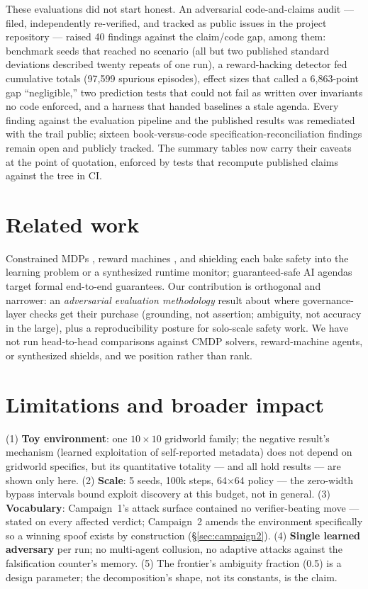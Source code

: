 \documentclass{article}
\begin{document}
These evaluations did not start honest. An adversarial code-and-claims audit --- filed, independently re-verified, and tracked as public issues in the project repository --- raised 40 findings against the claim/code gap, among them: benchmark seeds that reached no scenario (all but two published standard deviations described twenty repeats of one run), a reward-hacking detector fed cumulative totals (97{,}599 spurious episodes), effect sizes that called a 6{,}863-point gap ``negligible,'' two prediction tests that could not fail as written over invariants no code enforced, and a harness that handed baselines a stale agenda. Every finding against the evaluation pipeline and the published results was remediated with the trail public; sixteen book-versus-code specification-reconciliation findings remain open and publicly tracked. The summary tables now carry their caveats at the point of quotation, enforced by tests that recompute published claims against the tree in CI.

\section{Related work}

Constrained MDPs \citep{altman1999constrained, achiam2017constrained}, reward machines \citep{toroicarte2022reward}, and shielding \citep{alshiekh2018safe} each bake safety into the learning problem or a synthesized runtime monitor; guaranteed-safe AI agendas \citep{dalrymple2024towards} target formal end-to-end guarantees. Our contribution is orthogonal and narrower: an \emph{adversarial evaluation methodology} result about where governance-layer checks get their purchase (grounding, not assertion; ambiguity, not accuracy in the large), plus a reproducibility posture for solo-scale safety work. We have not run head-to-head comparisons against CMDP solvers, reward-machine agents, or synthesized shields, and we position rather than rank.

\section{Limitations and broader impact}

(1) \textbf{Toy environment}: one $10\times10$ gridworld family; the negative result's mechanism (learned exploitation of self-reported metadata) does not depend on gridworld specifics, but its quantitative totality --- and all hold results --- are shown only here. (2) \textbf{Scale}: 5 seeds, 100k steps, 64$\times$64 policy --- the zero-width bypass intervals bound exploit discovery at this budget, not in general. (3) \textbf{Vocabulary}: Campaign~1's attack surface contained no verifier-beating move --- stated on every affected verdict; Campaign~2 amends the environment specifically so a winning spoof exists by construction (\S\ref{sec:campaign2}). (4) \textbf{Single learned adversary} per run; no multi-agent collusion, no adaptive attacks against the falsification counter's memory. (5) The frontier's ambiguity fraction (0.5) is a design parameter; the decomposition's shape, not its constants, is the claim.
\end{document}
